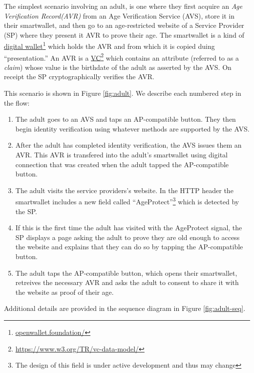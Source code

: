 \documentclass[11pt, oneside]{article}   	%
\newcommand{\hyperfootnote}[1][]{\def\ArgI{{#1}}\hyperfootnoteRelay}
\newcommand\hyperfootnoteRelay[2][]{\href{#1#2}{\ArgI}\footnote{\href{#1#2}{#2}}}
\begin{document}
The simplest scenario involving an adult, is one where they first acquire an \emph{Age Verification Record(AVR)} from an Age Verification Service (AVS), store it in their smartwallet, and then go to an age-restricted website of a Service Provider (SP) where they present it AVR to prove their age. The smartwallet is a kind of \hyperfootnote[digital wallet][https://]{openwallet.foundation/} which holds the AVR and from which it is copied duing ``presentation.'' An AVR is a \hyperfootnote[VC][https://]{https://www.w3.org/TR/vc-data-model/} which contains an attribute (referred to as a \emph{claim}) whose value is the birthdate of the adult as asserted by the AVS. On receipt the SP cryptographically verifies the AVR. 

This scenario is shown in Figure \ref{fig:adult}. We describe each numbered step in the flow: 

\begin{enumerate}
	\item The adult goes to an AVS and taps an AP-compatible button. They then begin identity verification using whatever methods are supported by the AVS. 
	\item After the adult has completed identity verification, the AVS issues them an AVR. This AVR is transfered into the adult's smartwallet using digital connection that was created when the adult tapped the AP-compatible button.
	\item The adult visits the service providers's website. In the HTTP header the smartwallet includes a new field called ``AgeProtect''\footnote{The design of this field is under active development and thus may change} which is detected by the SP. 
	\item If this is the first time the adult has visited with the AgeProtect signal, the SP displays a page asking the adult to prove they are old enough to access the website and explains that they can do so by tapping the AP-compatible button.
	\item The adult taps the AP-compatible button, which opens their smartwallet, retreives the necessary AVR and asks the adult to consent to share it with the website as proof of their age. 
\end{enumerate}

Additional details are provided in the sequence diagram in Figure \ref{fig:adult-seq}. 
\end{document}
